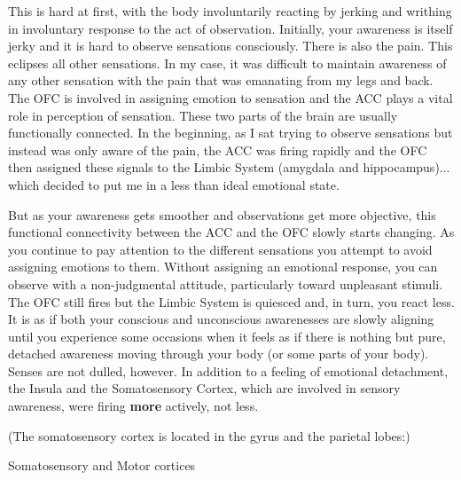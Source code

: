 \documentclass[a4paper, amsfonts, amssymb, amsmath, reprint, showkeys, nofootinbib, twoside]{revtex4-1}
\begin{document}
This is hard at first, with the body involuntarily reacting by jerking and writhing
in involuntary response to the act of observation. Initially, your awareness is
itself jerky and it is hard to observe sensations consciously. There is also the
pain. This eclipses all other sensations. In my case, it was difficult to maintain
awareness of any other sensation with the pain that was emanating from my legs and
back. The OFC is involved in assigning emotion to sensation \cite{ofcemotion} and the
ACC plays a vital role in perception of sensation. These two parts of the brain are
usually functionally connected. In the beginning, as I sat trying to observe
sensations but instead was only aware of the pain, the ACC was firing rapidly and the
OFC then assigned these signals to the Limbic System (amygdala and
hippocampus)... which decided to put me in a less than ideal emotional state.

But as your awareness gets smoother and observations get more objective, this
functional connectivity between the ACC and the OFC slowly starts changing. As you
continue to pay attention to the different sensations you attempt to avoid assigning
emotions to them. Without assigning an emotional response, you can observe with a
non-judgmental attitude, particularly toward unpleasant stimuli. The OFC still fires
but the Limbic System is quiesced and, in turn, you react less. It is as if both your
conscious and unconscious awarenesses are slowly aligning until you experience some
occasions when it feels as if there is nothing but pure, detached awareness moving
through your body (or some parts of your body). Senses are not dulled, however. In
addition to a feeling of emotional detachment, the Insula and the Somatosensory
Cortex, which are involved in sensory awareness, were firing \textbf{more} actively,
not less.

(The somatosensory cortex is located in the gyrus and the parietal lobes:) 

Somatosensory and Motor cortices
\end{document}

